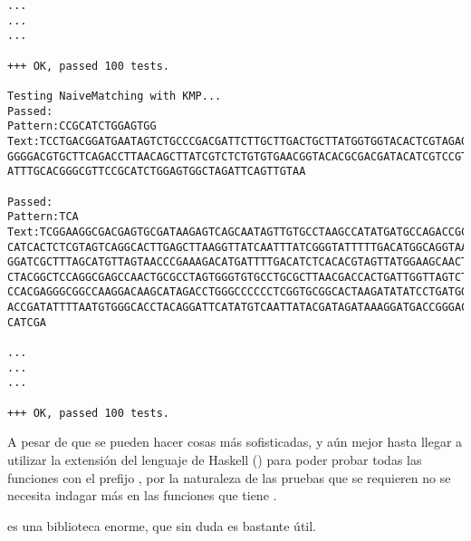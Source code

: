 \begin{verbatim}
...
...
...

+++ OK, passed 100 tests.

Testing NaiveMatching with KMP...
Passed:
Pattern:CCGCATCTGGAGTGG
Text:TCCTGACGGATGAATAGTCTGCCCGACGATTCTTGCTTGACTGCTTATGGTGGTACACTCGTAGAGGGT
GGGGACGTGCTTCAGACCTTAACAGCTTATCGTCTCTGTGTGAACGGTACACGCGACGATACATCGTCCGTAGG
ATTTGCACGGGCGTTCCGCATCTGGAGTGGCTAGATTCAGTTGTAA

Passed:
Pattern:TCA
Text:TCGGAAGGCGACGAGTGCGATAAGAGTCAGCAATAGTTGTGCCTAAGCCATATGATGCCAGACCGCCGT
CATCACTCTCGTAGTCAGGCACTTGAGCTTAAGGTTATCAATTTATCGGGTATTTTTGACATGGCAGGTAAGGG
GGATCGCTTTAGCATGTTAGTAACCCGAAAGACATGATTTTGACATCTCACACGTAGTTATGGAAGCAACTGCC
CTACGGCTCCAGGCGAGCCAACTGCGCCTAGTGGGTGTGCCTGCGCTTAACGACCACTGATTGGTTAGTCTGAT
CCACGAGGGCGGCCAAGGACAAGCATAGACCTGGGCCCCCCTCGGTGCGGCACTAAGATATATCCTGATGGACC
ACCGATATTTTAATGTGGGCACCTACAGGATTCATATGTCAATTATACGATAGATAAAGGATGACCGGGACACA
CATCGA

...
...
...

+++ OK, passed 100 tests.
\end{verbatim}

A pesar de que se pueden hacer cosas más sofisticadas, y aún mejor hasta llegar 
a utilizar la extensión del lenguaje de Haskell 
() para poder probar todas las funciones con el 
prefijo , por la naturaleza de las pruebas que se requieren no se 
necesita indagar más en las funciones que tiene {\QuickCheck}.

{\QuickCheck} es una biblioteca enorme, que sin duda es bastante útil.
